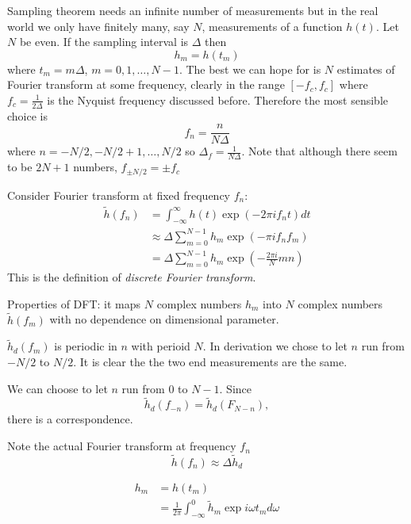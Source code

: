 \documentclass[a4paper]{article}
\newcommand*{\ft}{\tilde}
\begin{document}
Sampling theorem needs an infinite number of measurements but in the real world we only have finitely many, say \(N\), measurements of a function \(h(t)\). Let \(N\) be even. If the sampling interval is \(\Delta\) then
\[
  h_m = h(t_m)
\]
where \(t_m = m\Delta\), \(m = 0, 1, \dots, N - 1\). The best we can hope for is \(N\) estimates of Fourier transform at some frequency, clearly in the range \([-f_c, f_c]\) where \(f_c = \frac{1}{2\Delta}\) is the Nyquist frequency discussed before. Therefore the most sensible choice is
\[
  f_n = \frac{n}{N\Delta}
\]
where \(n = -N/2, -N/2 + 1, \dots, N/2\) so \(\Delta_f = \frac{1}{N\Delta}\). Note that although there seem to be \(2N + 1\) numbers, \(f_{\pm N/2} = \pm f_c\)

Consider Fourier transform at fixed frequency \(f_n\):
\begin{align*}
  \ft h(f_n) &= \int_{-\infty}^{\infty} h(t) \exp(-2\pi i f_n t) dt \\
             &\approx \Delta \sum_{m = 0}^{N - 1} h_m \exp(-\pi i f_n f_m) \\
             &= \Delta \sum_{m = 0}^{N - 1} h_m \exp \left( - \frac{2\pi i}{N} mn \right)
\end{align*}
This is the definition of \emph{discrete Fourier transform}.

Properties of DFT: it maps \(N\) complex numbers \(h_m\) into \(N\) complex numbers \(\ft h(f_m)\) with no dependence on dimensional parameter.

\(\ft h_d(f_m)\) is periodic in \(n\) with perioid \(N\). In derivation we chose to let \(n\) run from \(-N/2\) to \(N/2\). It is clear the the two end measurements are the same.

We can choose to let \(n\) run from \(0\) to \(N -1\). Since
\[
  \ft h_d(f_{-n}) = \ft h_d(F_{N - n}),
\]
there is a correspondence.

Note the actual Fourier transform at frequency \(f_n\)
\[
  \ft h(f_n) \approx \Delta \ft h_d
\]

\begin{align*}
  h_m &= h(t_m) \\
      &= \frac{1}{2\pi} \int_{-\infty}^{0} \ft h_m \exp i\omega t_m d\omega
\end{align*}
\end{document}

